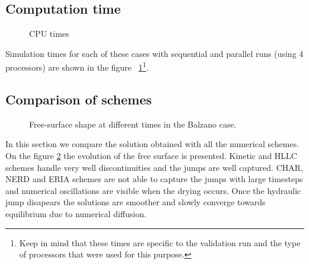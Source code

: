\subsection{Computation time}

\begin{figure}[H]
  \centering
  \caption{CPU times}\label{fig:balzano:cputime}
\end{figure}

Simulation times for each of these cases with sequential and parallel runs (using 4 processors) are shown in the figure ~\ref{fig:balzano:cputime}\footnote{Keep in mind that these times
are specific to the validation run and the type of processors that were used for this purpose.}.

\subsection{Comparison of schemes}

\begin{figure}[H]
\begin{minipage}[t]{0.5\textwidth}
 \centering
\end{minipage}%
\begin{minipage}[t]{0.5\textwidth}
 \centering
\end{minipage}
\begin{minipage}[t]{0.5\textwidth}
 \centering
\end{minipage}%
\begin{minipage}[t]{0.5\textwidth}
 \centering
\end{minipage}
\begin{minipage}[t]{0.5\textwidth}
 \centering
\end{minipage}%
\begin{minipage}[t]{0.5\textwidth}
 \centering
\end{minipage}
\caption{Free-surface shape at different times in the Balzano case.}
\label{fig:balzano:SL}
\end{figure}

In this section we compare the solution obtained with all the numerical schemes.
On the figure \ref{fig:balzano:SL} the evolution of the free surface is presented.
Kinetic and HLLC schemes handle very well discontinuities and the jumps are well captured.
CHAR, NERD and ERIA schemes are not able to capture the jumps with large timesteps and numerical oscillations are visible when the drying occurs. Once the hydraulic jump disapears the solutions are smoother and slowly converge towards equilibrium due to numerical diffusion.

